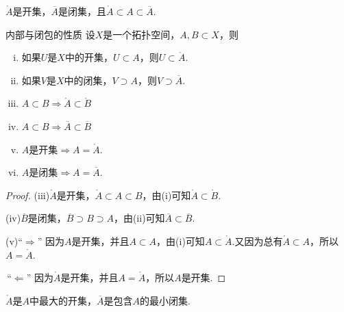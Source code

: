 \begin{note}
    $\mathring{A}$是开集，$\overline{A}$是闭集，且$\mathring{A}\subset A\subset \overline{A}$.
\end{note}

\begin{proposition}{内部与闭包的性质}
    设$X$是一个拓扑空间，$A,B\subset X$，则
    \begin{enumerate}[(i)]
        \item 如果$U$是$X$中的开集，$U\subset A$，则$U\subset \mathring{A}$.
        \item 如果$V$是$X$中的闭集，$V\supset A$，则$V\supset \overline{A}$.
        \item $A\subset B\Rightarrow \mathring{A}\subset\mathring{B}$
        \item $A\subset B\Rightarrow \overline{A}\subset\overline{B}$
        \item $A$是开集$\Rightarrow A=\mathring{A}$.
        \item $A$是闭集$\Rightarrow A=\overline{A}$.
    \end{enumerate}
\end{proposition}
\begin{proof}
    (iii)$\mathring{A}$是开集，$\mathring{A}\subset A\subset B$，由(i)可知$\mathring{A}\subset\mathring{B}$.\par
    (iv)$\overline{B}$是闭集，$\overline{B}\supset B\supset A$，由(ii)可知$\overline{A}\subset\overline{B}$.\par
    (v)“$\Rightarrow$” 因为$A$是开集，并且$A\subset A$，由(i)可知$A\subset \mathring{A}$.又因为总有$\mathring{A}\subset A$，所以$A=\mathring{A}$.\par
    \quad\,“$\Leftarrow$” 因为$\mathring{A}$是开集，并且$A=\mathring{A}$，所以$A$是开集.\par
\end{proof}

\begin{note}
    $\mathring{A}$是$A$中最大的开集，$\overline{A}$是包含$A$的最小闭集.
\end{note}

